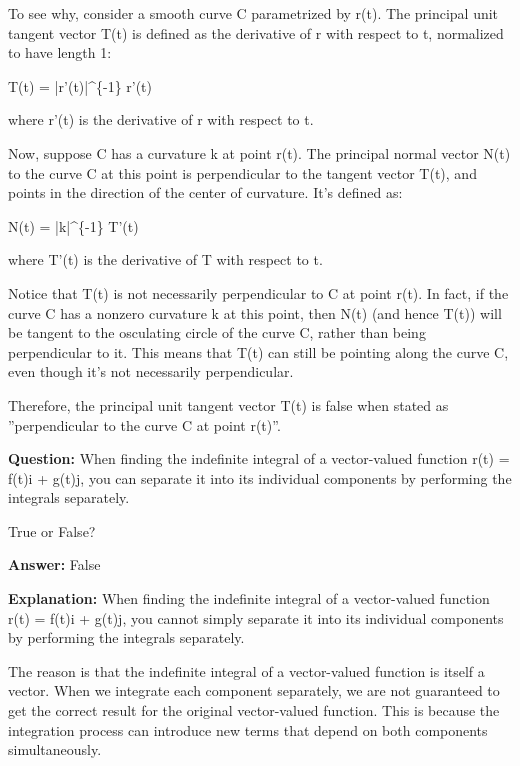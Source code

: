 \documentclass{article}
\begin{document}
To see why, consider a smooth curve C parametrized by r(t). The principal unit tangent vector T(t) is defined as the derivative of r with respect to t, normalized to have length 1:

T(t) = |r'(t)|{\textasciicircum}\{-1\} r'(t)

where r'(t) is the derivative of r with respect to t.

Now, suppose C has a curvature k at point r(t). The principal normal vector N(t) to the curve C at this point is perpendicular to the tangent vector T(t), and points in the direction of the center of curvature. It's defined as:

N(t) = |k|{\textasciicircum}\{-1\} T'(t)

where T'(t) is the derivative of T with respect to t.

Notice that T(t) is not necessarily perpendicular to C at point r(t). In fact, if the curve C has a nonzero curvature k at this point, then N(t) (and hence T(t)) will be tangent to the osculating circle of the curve C, rather than being perpendicular to it. This means that T(t) can still be pointing along the curve C, even though it's not necessarily perpendicular.

Therefore, the principal unit tangent vector T(t) is false when stated as ''perpendicular to the curve C at point r(t)''.
                
                \vspace{0.5cm} 
        
            
                \textbf {Question:} When finding the indefinite integral of a vector-valued function r(t) = f(t)i + g(t)j, you can separate it into its individual components by performing the integrals separately.

True or False?
                
                \textbf{Answer:} False

                \textbf{Explanation:} When finding the indefinite integral of a vector-valued function r(t) = f(t)i + g(t)j, you cannot simply separate it into its individual components by performing the integrals separately.

The reason is that the indefinite integral of a vector-valued function is itself a vector. When we integrate each component separately, we are not guaranteed to get the correct result for the original vector-valued function. This is because the integration process can introduce new terms that depend on both components simultaneously.
\end{document}
